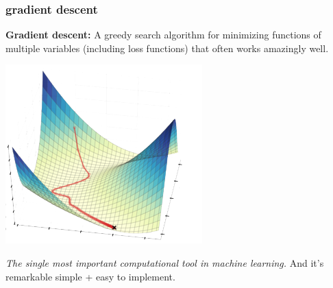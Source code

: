 \documentclass[handout,compress]{beamer}
\begin{document}
\begin{frame}
	\frametitle{gradient descent}
	\textbf{Gradient descent:} A greedy search algorithm for minimizing functions of multiple variables (including loss functions) that often works amazingly well.
	\begin{center}
		\includegraphics[width=.4\textwidth]{greedy_gradient.png}
	\end{center}
	\emph{The single most important computational tool in machine learning.} And it's remarkable simple + easy to implement.
\end{frame}
\end{document}
